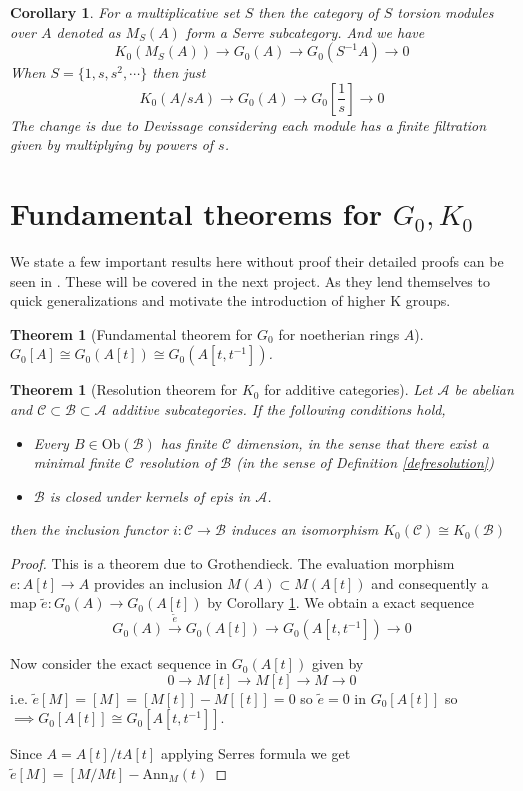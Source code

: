 \documentclass[12pt]{report}
\numberwithin{equation}{section}
\newtheorem{theorem}[dummy]{Theorem}
\newtheorem{corollary}[dummy]{Corollary}
\begin{document}
	\begin{corollary}\label{localizationk0corrolary}
		For a multiplicative set $S$ then the category of $S$ torsion modules over $A$ denoted as $M_S(A)$ form a Serre subcategory. And we have \[ K_0(M_S(A) ) \to G_0(A) \to G_0(S^{-1}A) \to 0 \]
		When $S=\{1,s,s^2,\cdots \}$ then just \[ K_0(A/sA) \to G_0(A) \to G_0[\frac{1}{s}]	 \to 0\]
		The change is due to Devissage considering each module has a finite filtration given by multiplying by powers of $s$.
	\end{corollary}


	\section{Fundamental theorems for $G_0, K_0$}
	We state a few important results here without proof their detailed proofs can be seen in \cite{weibel2013k}. These will be covered in the next project. As they lend themselves to quick generalizations and motivate the introduction of higher K groups.
	\begin{theorem}[Fundamental theorem for $G_0$ for noetherian rings $A$]\label{g0fund}
		$G_0[A] \cong G_0(A[t]) \cong G_0(A[t,t^{-1}])$.
	\end{theorem}
	\begin{theorem}[Resolution theorem for $K_0$ for additive categories]
		Let $\mathcal{A}$ be abelian and $\mathcal{C} \subset \mathcal{B} \subset \mathcal{A}$ additive subcategories. If the following conditions hold,
		\begin{itemize}
			\item Every $B \in \mathrm{Ob}(\mathcal{B})$ has finite $\mathcal{C}$ dimension, in the sense that there exist a minimal finite $\mathcal{C}$ resolution of $\mathcal{B}$ (in the sense of Definition \ref{defresolution})
			\item $\mathcal{B}$ is closed under kernels of epis in $\mathcal{A}$.
		\end{itemize}
		then the inclusion functor $i:\mathcal{C } \to \mathcal{B}$ induces an isomorphism $K_0(\mathcal{C}) \cong K_0(\mathcal{B})$
	\end{theorem}

	\begin{proof}
		This is a theorem due to Grothendieck.
		The evaluation morphism $e: A[t] \to A$ provides an inclusion $M(A) \subset M(A[t])$ and consequently a map $\tilde{e}: G_0(A) \to G_0(A[t])$ by Corollary \ref{localizationk0corrolary}. We obtain a exact sequence \[ G_0(A) \xrightarrow{\tilde{e}} G_0(A[t]) \to G_0(A[t,t^{-1}]) \to 0 \]
		
		Now consider the exact sequence in $G_0(A[t])$ given by \[ 0 \to M[t]\to M[t] \to M \to 0 \] i.e. $\tilde e [M]=[M]=[M[t]]-M[[t]]=0$ so $\tilde e =0$ in $G_0[A[t]]$ so $ \implies G_0[A[t]] \cong G_0[A[t,t^{-1	}]]$.
		
		Since $A=A[t]/tA[t]$ applying Serres formula we get $\tilde e [M]=[M/Mt]- \mathrm{Ann}_M(t)$
	\end{proof}
	
\end{document}
